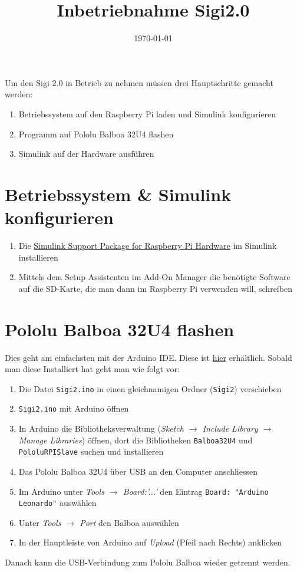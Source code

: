 \documentclass[a4paper]{article}
\title{Inbetriebnahme Sigi2.0}
\date{\today}
\begin{document}
\maketitle
Um den Sigi 2.0 in Betrieb zu nehmen müssen drei Hauptschritte gemacht werden:
\begin{enumerate}
	\item Betriebssystem auf den Raspberry Pi laden und Simulink konfigurieren
	\item Programm auf Pololu Balboa 32U4 flashen
	\item Simulink auf der Hardware ausführen
\end{enumerate}

\section*{Betriebssystem \& Simulink konfigurieren}
\begin{enumerate}
	\item Die \hyperref{https://ch.mathworks.com/matlabcentral/fileexchange/40313-simulink-support-package-for-raspberry-pi-hardware}{}{}{Simulink Support Package for Raspberry Pi Hardware} im Simulink installieren
	\item Mittels dem Setup Assistenten im Add-On Manager die benötigte Software auf die SD-Karte, die man dann im Raspberry Pi verwenden will, schreiben
\end{enumerate}

\section*{Pololu Balboa 32U4 flashen}
Dies geht am einfachsten mit der Arduino IDE. Diese ist \hyperref{https://www.arduino.cc/en/Main/Software}{}{}{hier} erhältlich. Sobald man diese Installiert hat geht man wie folgt vor:
\begin{enumerate}
	\item Die Datei \verb|Sigi2.ino| in einen gleichnamigen Ordner (\verb|Sigi2|) verschieben
	\item \verb|Sigi2.ino| mit Arduino öffnen
	\item In Arduino die Bibliotheksverwaltung (\textit{Sketch $\rightarrow$ Include Library $\rightarrow$ Manage Libraries}) öffnen, dort die Bibliotheken \verb|Balboa32U4| und \verb|PololuRPISlave| suchen und installieren
	\item Das Pololu Balboa 32U4 über USB an den Computer anschliessen
	\item Im Arduino unter \textit{Tools $\rightarrow$ Board:'...'} den Eintrag \verb|Board: "Arduino Leonardo"| auswählen
	\item Unter \textit{Tools $\rightarrow$ Port} den Balboa auswählen
	\item In der Hauptleiste von Arduino auf \textit{Upload} (Pfeil nach Rechts) anklicken
\end{enumerate}
Danach kann die USB-Verbindung zum Pololu Balboa wieder getrennt werden.\\
\end{document}
